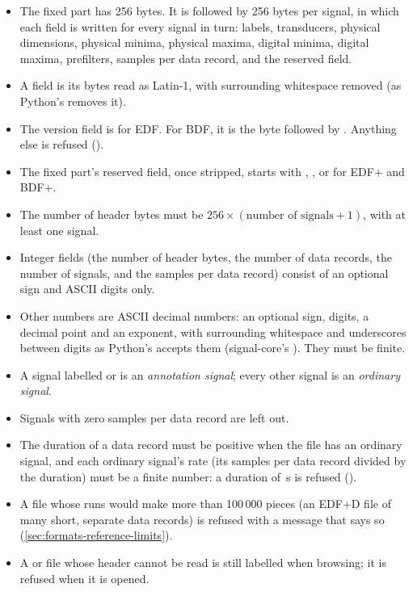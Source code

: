 \begin{itemize}
\item The fixed part has 256 bytes. It is followed by 256 bytes per signal, in which each field
  is written for every signal in turn: labels, transducers, physical dimensions, physical minima,
  physical maxima, digital minima, digital maxima, prefilters, samples per data record, and the
  reserved field.
\item A field is its bytes read as Latin-1, with surrounding whitespace removed (as Python's
   removes it).
\item The version field is  for EDF. For BDF, it is the byte  followed by
  . Anything else is refused ().
\item The fixed part's reserved field, once stripped, starts with , ,
   or  for EDF+ and BDF+.
\item The number of header bytes must be $256 \times (\text{number of signals} + 1)$, with at
  least one signal.
\item Integer fields (the number of header bytes, the number of data records, the number of
  signals, and the samples per data record) consist of an optional sign and ASCII digits only.
\item Other numbers are ASCII decimal numbers: an optional sign, digits, a decimal point and an
  exponent, with surrounding whitespace and underscores between digits as Python's
   accepts them (signal-core's ). They must be finite.
\item A signal labelled  or  is an \emph{annotation
  signal}; every other signal is an \emph{ordinary signal}.
\item Signals with zero samples per data record are left out.
\item The duration of a data record must be positive when the file has an ordinary signal, and each
  ordinary signal's rate (its samples per data record divided by the duration) must be a finite
  number: a duration of \,s is refused ().
\item A file whose runs would make more than 100\,000 pieces (an EDF+D file of many short,
  separate data records) is refused with a message that says so
  (\cref{sec:formats-reference-limits}).
\item A  or  file whose header cannot be read is still labelled 
  when browsing; it is refused when it is opened.
\end{itemize}

